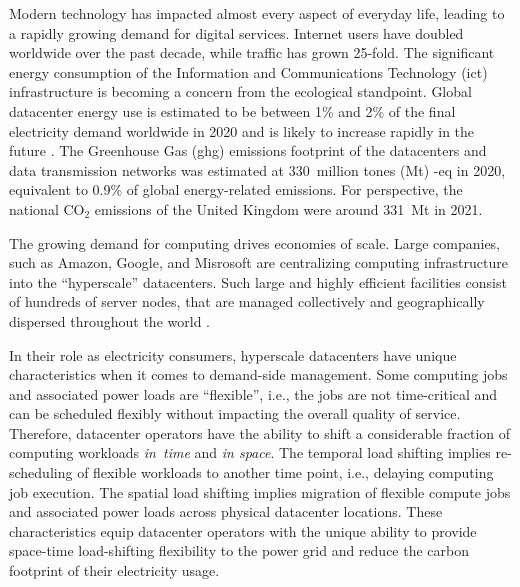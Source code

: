 %



Modern technology has impacted almost every aspect of everyday life, leading to a rapidly growing demand for digital services. Internet users have doubled worldwide over the past decade, while traffic has grown 25-fold. \cite{ieaDataCentresData2023}
The significant energy consumption of the Information and Communications Technology (\gls{ict}) infrastructure is becoming a concern from the ecological standpoint.
Global datacenter energy use is estimated to be between 1\% and 2\% of the final electricity demand worldwide in 2020 \cite{davidmyttonHowMuchEnergy2020, masanetRecalibratingGlobalData2020} and is likely to increase rapidly in the future \cite{andraeGlobalElectricityUsage2015}. 
The Greenhouse Gas (\gls{ghg}) emissions footprint of the datacenters and data transmission networks was estimated at 330~million tones (Mt) \co-eq in 2020, equivalent to 0.9\% of global energy-related emissions. \cite{ieaDataCentresData2023, malmodinICTSectorElectricity2023} 
For perspective, the national CO$_2$ emissions of the United Kingdom were around 331~Mt in 2021. \cite{UKnationalstats} 


The growing demand for computing drives economies of scale. Large companies, such as Amazon, Google, and Misrosoft are centralizing computing infrastructure into the \enquote{hyperscale} datacenters. 
Such large and highly efficient facilities consist of hundreds of server nodes, that are managed collectively and geographically dispersed throughout the world \cite{ThereAre500}. 

In their role as electricity consumers, hyperscale datacenters have unique characteristics when it comes to demand-side management. 
Some computing jobs and associated power loads are \enquote{flexible}, i.e., the jobs are not time-critical and can be scheduled flexibly without impacting the overall quality of service.
Therefore, datacenter operators have the ability to shift a considerable fraction of computing workloads \textit{in~time} and \textit{in space}. \cite{radovanovicIEEE2023} 
The temporal load shifting implies re-scheduling of flexible workloads to another time point, i.e., delaying computing job execution. 
The spatial load shifting implies migration of flexible compute jobs and associated power loads across physical datacenter locations. 
These characteristics equip datacenter operators with the unique ability to provide space-time load-shifting flexibility to the power grid \cite{zhangRemuneratingSpaceTime2022} and reduce the carbon footprint of their electricity usage. \cite{radovanovicIEEE2023, douCarbonAwareElectricityCost2017}

